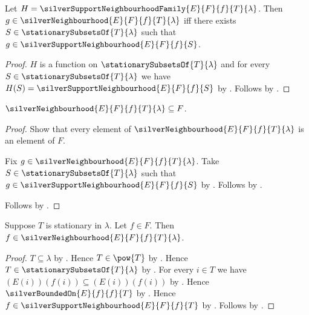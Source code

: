 \begin{proposition}\label{silver_neighbourhood_iff}
    Let $H=\silverSupportNeighbourhoodFamily{E}{F}{f}{T}{\lambda}$.
    Then $g\in\silverNeighbourhood{E}{F}{f}{T}{\lambda}$ iff
        there exists $S\in\stationarySubsetsOf{T}{\lambda}$ such that
            $g\in\silverSupportNeighbourhood{E}{F}{f}{S}$.
\end{proposition}
\begin{proof}
    $H$ is a function on $\stationarySubsetsOf{T}{\lambda}$ and
        for every $S\in\stationarySubsetsOf{T}{\lambda}$ we have
            $H(S)=\silverSupportNeighbourhood{E}{F}{f}{S}$
        by .
    Follows by .
\end{proof}

\begin{proposition}\label{silver_neighbourhood_subseteq}
    $\silverNeighbourhood{E}{F}{f}{T}{\lambda}\subseteq F$.
\end{proposition}
\begin{proof}
    Show that every element of $\silverNeighbourhood{E}{F}{f}{T}{\lambda}$
        is an element of $F$.
    \begin{subproof}
        Fix $g\in\silverNeighbourhood{E}{F}{f}{T}{\lambda}$.
        Take $S\in\stationarySubsetsOf{T}{\lambda}$ such that
            $g\in\silverSupportNeighbourhood{E}{F}{f}{S}$
            by .
        Follows by .
    \end{subproof}
    Follows by .
\end{proof}

\begin{proposition}\label{silver_neighbourhood_reflexive}
    Suppose $T$ is stationary in $\lambda$.
    Let $f\in F$.
    Then $f\in\silverNeighbourhood{E}{F}{f}{T}{\lambda}$.
\end{proposition}
\begin{proof}
    $T\subseteq\lambda$ by .
    Hence $T\in\pow{T}$ by .
    Hence $T\in\stationarySubsetsOf{T}{\lambda}$
        by .
    For every $i\in T$ we have
        $(E(i))(f(i))\subseteq(E(i))(f(i))$
        by .
    Hence $\silverBoundedOn{E}{f}{f}{T}$
        by .
    Hence $f\in\silverSupportNeighbourhood{E}{F}{f}{T}$
        by .
    Follows by .
\end{proof}

